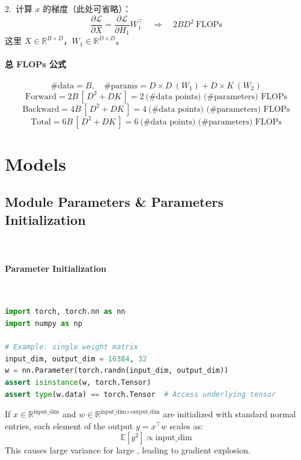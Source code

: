 2.~计算 $x$ 的梯度（此处可省略）：
\[
\frac{\partial \mathcal{L}}{\partial X}
= \frac{\partial \mathcal{L}}{\partial H_1} W_1^\top
\quad\Rightarrow\quad 2 B D^2 \ \text{FLOPs}
\]
这里 $X \in \mathbb{R}^{B \times D}$，$W_1 \in \mathbb{R}^{D \times D}$。


 \paragraph{总 FLOPs 公式}
\[
\#\text{data} = B,
\quad \#\text{params} = D \times D \ (\text{$W_1$}) + D \times K \ (\text{$W_2$})
\]
\[
\text{Forward} = 2B \,[\,D^2 + D K\,] = 2 \ \text{(\# data points) (\# parameters) FLOPs}
\]
\[
\text{Backward} = 4B \,[\,D^2 + D K\,] = 4 \ \text{(\# data points) (\# parameters) FLOPs}
\]
\[
\text{Total} = 6B \,[\,D^2 + D K\,] = 6 \ \text{(\# data points) (\# parameters) FLOPs}
\]





\clearpage
{\chaptoc\noindent\begin{minipage}[inner sep=0,outer sep=0]{0.9\linewidth}\section{Models}
\end{minipage}}
\subsection{Module Parameters \& Parameters Initialization}~{}

\paragraph{Parameter Initialization}~{}

\begin{lstlisting}[language=Python]
import torch, torch.nn as nn
import numpy as np

# Example: single weight matrix
input_dim, output_dim = 16384, 32
w = nn.Parameter(torch.randn(input_dim, output_dim))
assert isinstance(w, torch.Tensor)
assert type(w.data) == torch.Tensor  # Access underlying tensor
\end{lstlisting}

If $x \in \mathbb{R}^{\text{input\_dim}}$ and 
$w \in \mathbb{R}^{\text{input\_dim} \times \text{output\_dim}}$ 
are initialized with standard normal entries, 
each element of the output $y = x^\top w$ scales as:
\[
\mathbb{E}[y^2] \propto \text{input\_dim}
\]
This causes large variance for large , 
leading to gradient explosion.

